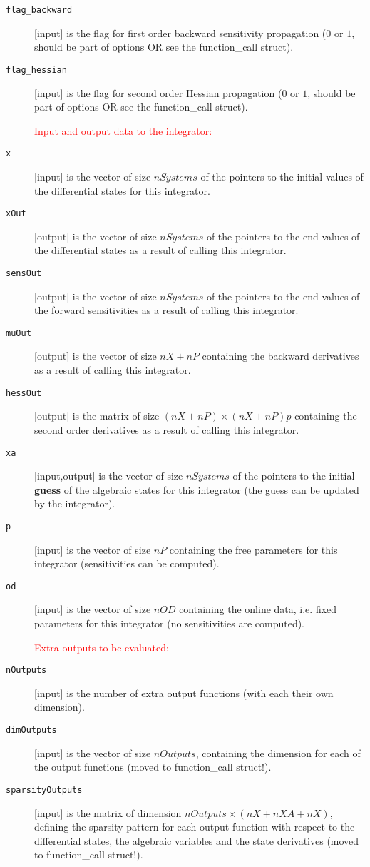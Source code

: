 \documentclass{report}
\begin{document}
\begin{description}
\item[{\tt flag\_backward}] [input] is the flag for first order backward sensitivity propagation ($0$ or $1$, should be part of options OR see the function\_call struct).
\item[{\tt flag\_hessian}] [input] is the flag for second order Hessian propagation ($0$ or $1$, should be part of options OR see the function\_call struct).
\item[] \textcolor{red}{Input and output data to the integrator:}
\item[{\tt x}] [input] is the vector of size $nSystems$ of the pointers to the initial values of the differential states for this integrator.
\item[{\tt xOut}] [output] is the vector of size $nSystems$ of the pointers to the end values of the differential states as a result of calling this integrator.
\item[{\tt sensOut}] [output] is the vector of size $nSystems$ of the pointers to the end values of the forward sensitivities as a result of calling this integrator.
\item[{\tt muOut}] [output] is the vector of size $nX+nP$ containing the backward derivatives as a result of calling this integrator.
\item[{\tt hessOut}] [output] is the matrix of size $(nX+nP) \times (nX+nP)p$ containing the second order derivatives as a result of calling this integrator.
\item[{\tt xa}] [input,output] is the vector of size $nSystems$ of the pointers to the initial {\bf guess} of the algebraic states for this integrator (the guess can be updated by the integrator).
\item[{\tt p}] [input] is the vector of size $nP$ containing the free parameters for this integrator (sensitivities can be computed).
\item[{\tt od}] [input] is the vector of size $nOD$ containing the online data, i.e. fixed parameters for this integrator (no sensitivities are computed).
\item[] \textcolor{red}{Extra outputs to be evaluated:}
\item[{\tt nOutputs}] [input] is the number of extra output functions (with each their own dimension).
\item[{\tt dimOutputs}] [input] is the vector of size $nOutputs$, containing the dimension for each of the output functions (moved to function\_call struct!).
\item[{\tt sparsityOutputs}] [input] is the matrix of dimension $nOutputs \times (nX+nXA+nX)$, defining the sparsity pattern for each output function with respect to the differential states, the algebraic variables and the state derivatives (moved to function\_call struct!).

\end{description}
\end{document}
